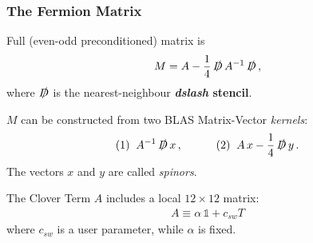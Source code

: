 \documentclass{beamer}
\begin{document}
  \begin{frame}
    \frametitle{The Fermion Matrix}
    Full (even-odd preconditioned) matrix is
    \begin{align*}
      M = A - \frac 14 \, \slashed D \, A^{-1} \, \slashed D \,,
    \end{align*}
    where $\slashed D$ is the nearest-neighbour \textbf{\textit{dslash} stencil}.
    \vfill

    $M$ can be constructed from two BLAS Matrix-Vector \textit{kernels}:
    \begin{align*}
      (1) \;\; A^{-1} \, \slashed D \, x \,, \quad \quad \quad
      (2) \;\; A \, x - \frac 14 \, \slashed D \, y \,.
    \end{align*}
    The vectors $x$ and $y$ are called \textit{spinors}.
    \vfill

    The Clover Term $A$ includes a local $12 \times 12 $ matrix:
    \begin{align*}
      A \equiv
      \alpha \, \mathbb 1
      + c_{sw} T
    \end{align*}
    where $c_{sw}$ is a user parameter, while $\alpha$ is fixed.
    \vfill
  \end{frame}

\end{document}
